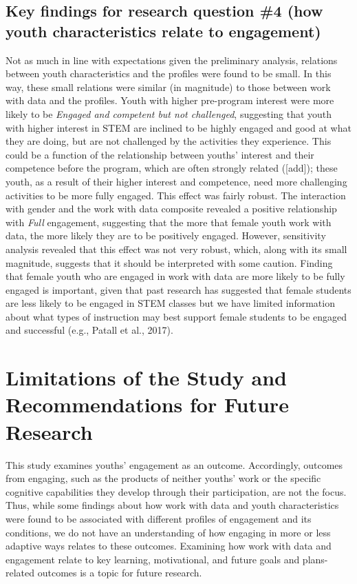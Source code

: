\documentclass[]{msu-thesis}
\theoremstyle{definition}
\theoremstyle{definition}
\theoremstyle{definition}
\theoremstyle{remark}
\begin{document}
\subsection{Key findings for research question \#4 (how youth
characteristics relate to
engagement)}\label{key-findings-for-research-question-4-how-youth-characteristics-relate-to-engagement}

Not as much in line with expectations given the preliminary analysis,
relations between youth characteristics and the profiles were found to
be small. In this way, these small relations were similar (in magnitude)
to those between work with data and the profiles. Youth with higher
pre-program interest were more likely to be \emph{Engaged and competent
but not challenged}, suggesting that youth with higher interest in STEM
are inclined to be highly engaged and good at what they are doing, but
are not challenged by the activities they experience. This could be a
function of the relationship between youths' interest and their
competence before the program, which are often strongly related
({[}add{]}); these youth, as a result of their higher interest and
competence, need more challenging activities to be more fully engaged.
This effect was fairly robust. The interaction with gender and the work
with data composite revealed a positive relationship with \emph{Full}
engagement, suggesting that the more that female youth work with data,
the more likely they are to be positively engaged. However, sensitivity
analysis revealed that this effect was not very robust, which, along
with its small magnitude, suggests that it should be interpreted with
some caution. Finding that female youth who are engaged in work with
data are more likely to be fully engaged is important, given that past
research has suggested that female students are less likely to be
engaged in STEM classes but we have limited information about what types
of instruction may best support female students to be engaged and
successful (e.g., Patall et al., 2017).

\section{Limitations of the Study and Recommendations for Future
Research}\label{limitations-of-the-study-and-recommendations-for-future-research}

This study examines youths' engagement as an outcome. Accordingly,
outcomes from engaging, such as the products of neither youths' work or
the specific cognitive capabilities they develop through their
participation, are not the focus. Thus, while some findings about how
work with data and youth characteristics were found to be associated
with different profiles of engagement and its conditions, we do not have
an understanding of how engaging in more or less adaptive ways relates
to these outcomes. Examining how work with data and engagement relate to
key learning, motivational, and future goals and plans-related outcomes
is a topic for future research.
\end{document}
